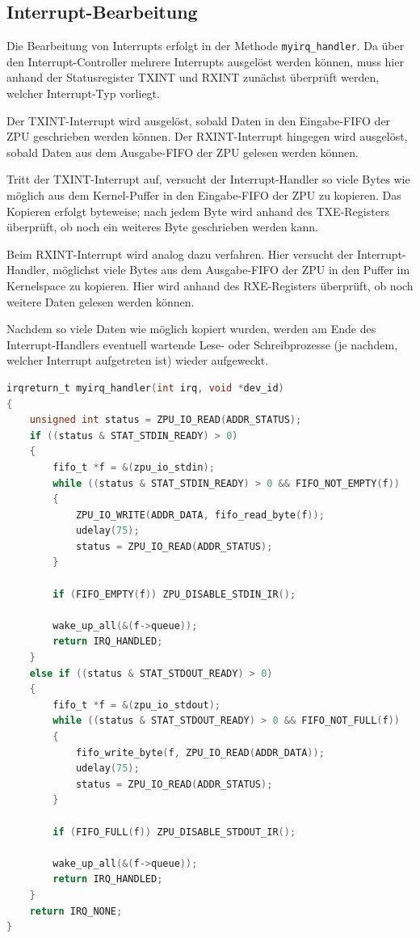 \documentclass[11pt]{scrartcl}
\begin{document}
\subsection{Interrupt-Bearbeitung}

Die Bearbeitung von Interrupts erfolgt in der Methode \texttt{myirq\_handler}. Da über den Interrupt-Controller mehrere Interrupts ausgelöst werden können, muss hier anhand der Statusregister TXINT und RXINT zunächst überprüft werden, welcher Interrupt-Typ vorliegt.

Der TXINT-Interrupt wird ausgelöst, sobald Daten in den Eingabe-FIFO der ZPU geschrieben werden können. Der RXINT-Interrupt hingegen wird ausgelöst, sobald Daten aus dem Ausgabe-FIFO der ZPU gelesen werden können.

Tritt der TXINT-Interrupt auf, versucht der Interrupt-Handler so viele Bytes wie möglich aus dem Kernel-Puffer in den Eingabe-FIFO der ZPU zu kopieren. Das Kopieren erfolgt byteweise; nach jedem Byte wird anhand des TXE-Registers überprüft, ob noch ein weiteres Byte geschrieben werden kann.

Beim RXINT-Interrupt wird analog dazu verfahren. Hier versucht der Interrupt-Handler, möglichst viele Bytes aus dem Ausgabe-FIFO der ZPU in den Puffer im Kernelspace zu kopieren. Hier wird anhand des RXE-Registers überprüft, ob noch weitere Daten gelesen werden können.

Nachdem so viele Daten wie möglich kopiert wurden, werden am Ende des Interrupt-Handlers eventuell wartende Lese- oder Schreibprozesse (je nachdem, welcher Interrupt aufgetreten ist) wieder aufgeweckt.

\begin{lstlisting}[language=C, firstnumber=12, label=modzpu_irqh, caption=Implementierung des Interrupt-Handlers,float=btp]
irqreturn_t myirq_handler(int irq, void *dev_id)
{
	unsigned int status = ZPU_IO_READ(ADDR_STATUS);
	if ((status & STAT_STDIN_READY) > 0)
	{
		fifo_t *f = &(zpu_io_stdin);
		while ((status & STAT_STDIN_READY) > 0 && FIFO_NOT_EMPTY(f))
		{
			ZPU_IO_WRITE(ADDR_DATA, fifo_read_byte(f));
			udelay(75);
			status = ZPU_IO_READ(ADDR_STATUS);
		}
		
		if (FIFO_EMPTY(f)) ZPU_DISABLE_STDIN_IR();
		
		wake_up_all(&(f->queue));
		return IRQ_HANDLED;
	}
	else if ((status & STAT_STDOUT_READY) > 0)
	{
		fifo_t *f = &(zpu_io_stdout);
		while ((status & STAT_STDOUT_READY) > 0 && FIFO_NOT_FULL(f))
		{
			fifo_write_byte(f, ZPU_IO_READ(ADDR_DATA));
			udelay(75);
			status = ZPU_IO_READ(ADDR_STATUS);
		}
		
		if (FIFO_FULL(f)) ZPU_DISABLE_STDOUT_IR();
		
		wake_up_all(&(f->queue));
		return IRQ_HANDLED;
	}
	return IRQ_NONE;
}
\end{lstlisting}
\end{document}
